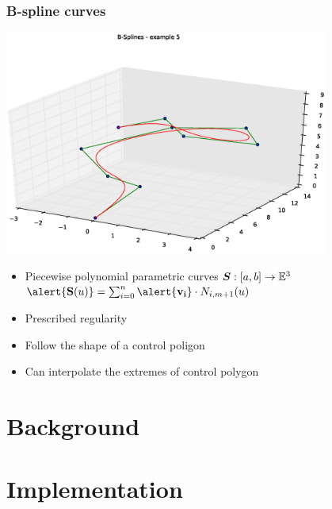 \begin{frame}
  \frametitle{B-spline curves}
  \begin{center}
    \includegraphics[width=0.8\textwidth, trim=110 30 50 50, clip]{img/bspline.eps}
  \end{center}
  \pause
  \begin{itemize}
  \item Piecewise polynomial \alert{parametric} curves
    $\boldsymbol{S}:[a,b]\rightarrow\mathbb{E}^3$
    $\alert{\mathbf{S}(u)}=\sum_{i=0}^n\alert{\mathbf{v_i}}\cdot
    N_{i,m+1}(u)$\pause
  \item Prescribed \alert{regularity}\pause
  \item Follow the shape of a \alert{control poligon}\pause
  \item Can interpolate the
    \alert{extremes} of control polygon
  \end{itemize}
\end{frame}

\section{Background}


\section{Implementation}

